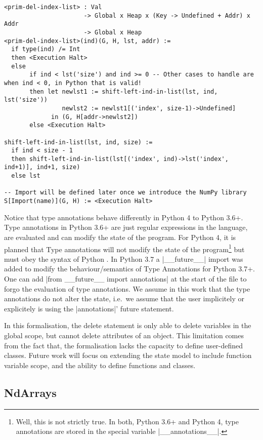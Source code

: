 \begin{verbatim}
<prim-del-index-list> : Val
                      -> Global x Heap x (Key -> Undefined + Addr) x Addr
                      -> Global x Heap
<prim-del-index-list>(ind)(G, H, lst, addr) :=
  if type(ind) /= Int
  then <Execution Halt>
  else
       if ind < lst('size') and ind >= 0 -- Other cases to handle are when ind < 0, in Python that is valid!
       then let newlst1 := shift-left-ind-in-list(lst, ind, lst('size'))
                newlst2 := newlst1[('index', size-1)->Undefined]
             in (G, H[addr->newlst2])
       else <Execution Halt>

shift-left-ind-in-list(lst, ind, size) :=
  if ind < size - 1
  then shift-left-ind-in-list(lst[('index', ind)->lst('index', ind+1)], ind+1, size)
  else lst

-- Import will be defined later once we introduce the NumPy library
S[Import(name)](G, H) := <Execution Halt>
\end{verbatim}

Notice that type annotations behave differently in Python 4 to Python
3.6+. Type annotations in Python 3.6+ are just regular expressions in
the language, are evaluated and can modify the state of the program. For
Python 4, it is planned that Type annotations will not modify the state
of the program\footnote{Well, this is not strictly true. In both, Python
  3.6+ and Python 4, type annotations are stored in the special variable
  \pycode|__annotations__|. {}} but must obey the syntax of Python {}. In Python 3.7 a \pycode|__future__| import was added to
modify the behaviour/semantics of Type Annotations for Python 3.7+. One
can add \pycode|from __future__ import annotations|
at the start of the file to forgo the evaluation of type annotations. We
assume in this work that the type annotations do not alter the state,
i.e.~we assume that the user implicitely or explicitely is using the
\pycode|annotations|' future statement.

In this formalisation, the delete statement is only able to delete
variables in the global scope, but cannot delete attributes of an
object. This limitation comes from the fact that, the formalisation
lacks the capacity to define user-defined classes. Future work will
focus on extending the state model to include function variable scope,
and the ability to define functions and classes.

\subsection{NdArrays}\label{ndarrays}

